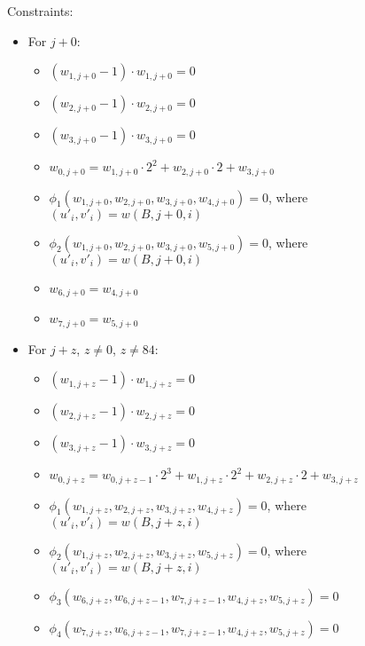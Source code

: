 Constraints:
\begin{itemize}
    \item For $j + 0$:
        \begin{itemize}
            \item $(w_{1, j + 0} - 1) \cdot w_{1, j + 0} = 0$ 
        	 \item $(w_{2, j + 0} - 1) \cdot w_{2, j + 0} = 0$
        	 \item $(w_{3, j + 0} - 1) \cdot w_{3, j + 0} = 0$ 
            \item $w_{0, j + 0} = w_{1, j + 0} \cdot 2^2 + w_{2, j + 0} \cdot 2 + w_{3, j + 0}$
            \item $\phi_1(w_{1, j + 0}, w_{2, j + 0}, w_{3, j + 0}, w_{4, j + 0}) = 0$, where $(u'_{i}, v'_{i}) = w(B, j + 0, i)$
            \item $\phi_2(w_{1, j + 0}, w_{2, j + 0}, w_{3, j + 0}, w_{5, j + 0}) = 0$, where $(u'_{i}, v'_{i}) = w(B, j + 0, i)$
            \item $w_{6, j + 0} = w_{4, j + 0}$
            \item $w_{7, j + 0} = w_{5, j + 0}$
        \end{itemize}
    \item For $j + z$, $z \neq 0$, $z \neq 84$:
        \begin{itemize}
            \item $(w_{1, j + z} - 1) \cdot w_{1, j + z} = 0$ 
        	 \item $(w_{2, j + z} - 1) \cdot w_{2, j + z} = 0$
        	 \item $(w_{3, j + z} - 1) \cdot w_{3, j + z} = 0$ 
            \item $w_{0, j + z} = w_{0, j + z - 1} \cdot 2^3 + w_{1, j + z} \cdot 2^2 + w_{2, j + z} \cdot 2 + w_{3, j + z}$
            \item $\phi_1(w_{1, j + z}, w_{2, j + z}, w_{3, j + z}, w_{4, j + z}) = 0$, where $(u'_{i}, v'_{i}) = w(B, j + z, i)$
            \item $\phi_2(w_{1, j + z}, w_{2, j + z}, w_{3, j + z}, w_{5, j + z }) = 0$, where $(u'_{i}, v'_{i}) = w(B, j + z, i)$
            \item $\phi_3(w_{6, j + z}, w_{6, j + z - 1}, w_{7, j + z - 1}, w_{4, j + z}, w_{5, j + z }) = 0$
            \item $\phi_4(w_{7, j + z}, w_{6, j + z - 1}, w_{7, j + z - 1}, w_{4, j + z}, w_{5, j + z }) = 0$
        \end{itemize}


\end{itemize}

